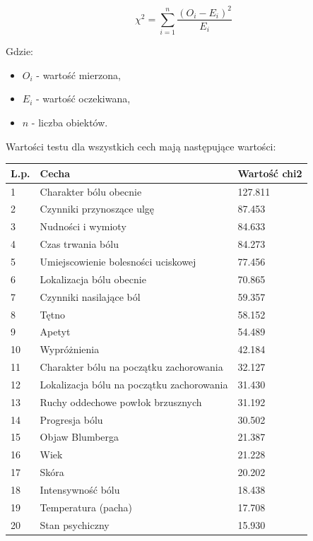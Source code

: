 \documentclass{report}
\begin{document}
    $$
    \chi ^ 2 = \sum_{i=1}^{n}{ \frac{{(O_i - E_i) ^ 2}}{E_i}}
    $$

    \noindent
    Gdzie:
    \begin{itemize}
        \item $O_i$ - wartość mierzona,
        \item $E_i$ - wartość oczekiwana,
        \item $n$ - liczba obiektów.
    \end{itemize}

    Wartości testu dla wszystkich cech mają następujące wartości: \\

    \begin{tabular}{|l|l|l|}
        \hline L.p. & Cecha & Wartość chi2 \\
        \hline 1 & Charakter bólu obecnie & 127.811 \\
        \hline 2 & Czynniki przynoszące ulgę & 87.453 \\
        \hline 3 & Nudności i wymioty & 84.633 \\
        \hline 4 & Czas trwania bólu & 84.273 \\
        \hline 5 & Umiejscowienie bolesności uciskowej & 77.456 \\
        \hline 6 & Lokalizacja bólu obecnie & 70.865 \\
        \hline 7 & Czynniki nasilające ból & 59.357 \\
        \hline 8 & Tętno & 58.152 \\
        \hline 9 & Apetyt & 54.489 \\
        \hline 10 & Wypróżnienia & 42.184 \\
        \hline 11 & Charakter bólu na początku zachorowania & 32.127 \\
        \hline 12 & Lokalizacja bólu na początku zachorowania & 31.430 \\
        \hline 13 & Ruchy oddechowe powłok brzusznych & 31.192 \\
        \hline 14 & Progresja bólu & 30.502 \\
        \hline 15 & Objaw Blumberga & 21.387 \\
        \hline 16 & Wiek & 21.228 \\
        \hline 17 & Skóra & 20.202 \\
        \hline 18 & Intensywność bólu & 18.438 \\
        \hline 19 & Temperatura (pacha) & 17.708 \\
        \hline 20 & Stan psychiczny & 15.930 \\

\end{tabular}
\end{document}
